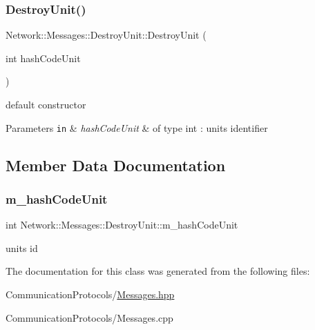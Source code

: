\subsubsection{\texorpdfstring{Destroy\+Unit()}{DestroyUnit()}}
{\footnotesize\ttfamily Network\+::\+Messages\+::\+Destroy\+Unit\+::\+Destroy\+Unit (\begin{DoxyParamCaption}\item[{int}]{hash\+Code\+Unit }\end{DoxyParamCaption})\hspace{0.3cm}{\ttfamily [inline]}}



default constructor 


\begin{DoxyParams}[1]{Parameters}
\mbox{\tt in}  & {\em hash\+Code\+Unit} & of type int \+: unit\textquotesingle{}s identifier \\
\hline
\end{DoxyParams}


\subsection{Member Data Documentation}
\mbox{\label{class_network_1_1_messages_1_1_destroy_unit_a7453e48d54114f52ce66918f88cc376c}} 
\subsubsection{\texorpdfstring{m\+\_\+hash\+Code\+Unit}{m\_hashCodeUnit}}
{\footnotesize\ttfamily int Network\+::\+Messages\+::\+Destroy\+Unit\+::m\+\_\+hash\+Code\+Unit}

unit\textquotesingle{}s id 

The documentation for this class was generated from the following files\+:\begin{DoxyCompactItemize}
\item 
Communication\+Protocols/\hyperlink{_messages_8hpp}{Messages.\+hpp}\item 
Communication\+Protocols/Messages.\+cpp\end{DoxyCompactItemize}
